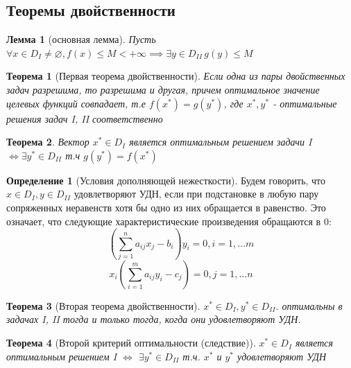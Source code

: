 \documentclass[a4paper]{article}
\newtheorem{theorem}{Теорема}[section]
\newtheorem{lemma}{Лемма}[section]
\theoremstyle{definition}
\newtheorem*{definition}{Определение}
\theoremstyle{remark}
\begin{document}
\subsection{Теоремы двойственности}
\begin{lemma}[основная лемма]
    Пусть $\forall x\in D_I \neq \varnothing, f(x)\leq M < +\infty\implies \exists y \in D_{II}\, g(y)\leq M$
\end{lemma}
\begin{theorem}[Первая теорема двойственности]
    Если одна из пары двойственных задач разрешима, то разрешима и другая, причем оптимальное значение целевых функций совпадает, т.е $f(x^*) = g(y^*)$, где $x^*, y^*$ - оптимальные решения задач I, II соответственно
\end{theorem}
\begin{theorem}
    Вектор $x^* \in D_I$ является оптимальным решением задачи 
    I $\Leftrightarrow \exists y^* \in D_{II}$ т.ч  $g(y^*) = f(x^*)$    
\end{theorem}
\begin{definition}[Условия дополняющей нежесткости]
    Будем говорить, что $x\in D_I, y \in D_{II}$ удовлетворяют УДН, если при подстановке в любую пару сопряженных неравенств хотя бы одно из них обращается в равенство. Это означает, что следующие характеристические произведения обращаются в 0:
    \[(\sum_{j = 1}^n a_{ij}x_j - b_i)y_i = 0, i  = 1, \dots m\]
    \[x_i (\sum_{i = 1}^m a_{ij}y_i - c_j) = 0, j = 1, \dots n\]
\end{definition}
\begin{theorem}[Вторая теорема двойственности]
    $x^* \in D_I, y^*\in D_{II}.$ оптимальны в задачах I, II тогда и только тогда, когда они удовлетворяют УДН.
\end{theorem}
\begin{theorem}[Второй критерий оптимальности (следствие)]
    \(x^* \in D_I\) является оптимальным решением I \(\Leftrightarrow\)
    \(\exists y^* \in D_{II}\) т.ч. \(x^*\) и \(y^*\) удовлетворяют УДН
\end{theorem}
\end{document}
